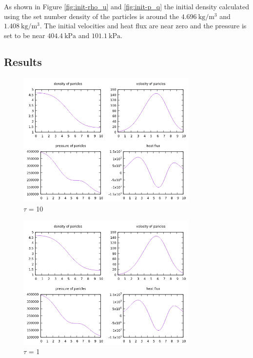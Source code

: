 \documentclass[paper=a4, fontsize=12pt]{scrartcl}
\begin{document}
\noindent
As shown in Figure \ref{fig:init-rho_u} and \ref{fig:init-p_q} the initial density calculated using the
set number density of the particles is around the $\SI{4.696}{\kilogram \per \meter^3}$
and $\SI{1.408}{\kilogram \per \meter^3}$.
The initial velocities and heat flux are near zero and the pressure is set to be near
$\SI{404.4}{\kilo \pascal}$ and $\SI{101.1}{\kilo \pascal}$.

\subsection{Results}
\begin{figure}[H]
        \centering
        \includegraphics[width=0.8\textwidth]{tau10}
        \caption{$\tau$ = 10}
        \label{fig:tau10}
\end{figure}
\begin{figure}[H]
        \centering
        \includegraphics[width=0.8\textwidth]{tau1}
        \caption{$\tau$ = 1}
        \label{fig:tau1}
\end{figure}
\end{document}
